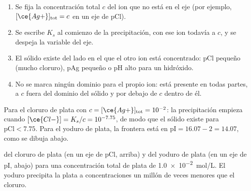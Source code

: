 \begin{method}\label{met:b1:precipitation:existence-domain}
\begin{enumerate}
  \item Se fija la concentración total $c$ del ion que no está en el eje
        (por ejemplo, $[\ce{Ag+}]_{\mathrm{tot}} = c$ en un eje de pCl).
  \item Se escribe $K_s$ al comienzo de la precipitación, con ese ion
        todavía a $c$, y se despeja la variable del eje.
  \item El sólido existe del lado en el que el otro ion está concentrado:
        pCl pequeño (mucho cloruro), pAg pequeño o pH alto para un
        hidróxido.
  \item No se marca ningún dominio para el propio ion: está presente en
        todas partes, a $c$ fuera del dominio del sólido y por debajo de
        $c$ dentro de él.
\end{enumerate}
\end{method}

Para el cloruro de plata con $c = [\ce{Ag+}]_{\mathrm{tot}} = 10^{-2}$: la
precipitación empieza cuando $[\ce{Cl-}] = K_s/c = 10^{-7.75}$, de modo
que el sólido existe para $\mathrm{pCl} < 7.75$. Para el yoduro de plata,
la frontera está en
$\mathrm{pI} = 16.07 - 2 = 14.07$, como se dibuja abajo.

\begin{omfigure}

{\small {} del cloruro de plata (en un eje de pCl,
arriba) y del yoduro de plata (en un eje de pI, abajo) para una
concentración total de plata de \qty{1.0e-2}{mol/L}. El yoduro precipita
la plata a concentraciones un millón de veces menores que el cloruro.}
\end{omfigure}

